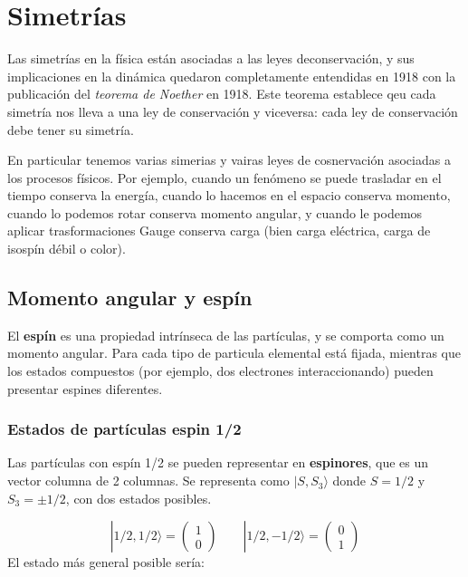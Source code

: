 \chapter{Simetrías}

Las simetrías en la física están asociadas a las leyes deconservación, y sus implicaciones en la dinámica quedaron completamente entendidas en 1918 con la publicación del \textit{teorema de Noether} en 1918. Este teorema establece qeu cada simetría nos lleva a una ley de conservación y viceversa: cada ley de conservación debe tener su simetría. 

En particular tenemos varias simerias y vairas leyes de cosnervación asociadas a los procesos físicos. Por ejemplo, cuando un fenómeno se puede trasladar en el tiempo conserva la energía, cuando lo hacemos en el espacio conserva momento, cuando lo podemos rotar conserva momento angular, y cuando le podemos aplicar trasformaciones Gauge conserva carga (bien carga eléctrica, carga de isospín débil o color). 

\section{Momento angular y espín}

El \textbf{espín} es una propiedad intrínseca de las partículas, y se comporta como un momento angular. Para cada tipo de particula elemental está fijada, mientras que los estados compuestos (por ejemplo, dos electrones interaccionando) pueden presentar espines diferentes. 

\subsection{Estados de partículas espin 1/2}

Las partículas con espín 1/2 se pueden representar en \textbf{espinores}, que es un vector columna de 2 columnas. Se representa como $|S,S_3 \rangle $ donde $S=1/2$ y $S_3=\pm 1/2$, con dos estados posibles. 

\begin{equation}
    |1/2,1/2 \rangle  = \begin{pmatrix}
         1 \\ 0 
    \end{pmatrix} \qquad
    |1/2,-1/2 \rangle  = \begin{pmatrix}
        0 \\ 1 
    \end{pmatrix}
\end{equation}
El estado más general posible sería: 

